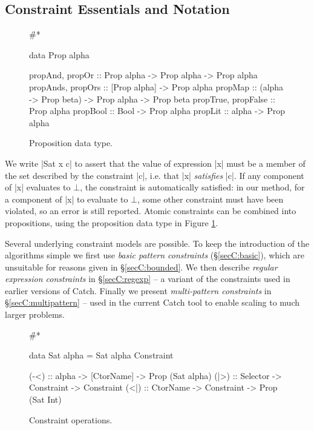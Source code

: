 \subsection{Constraint Essentials and Notation}
\label{secC:constraints}

\begin{figure}
\h{#*}\begin{code}
data Prop alpha

propAnd, propOr           :: Prop alpha -> Prop alpha -> Prop alpha
propAnds, propOrs         :: [Prop alpha] -> Prop alpha
propMap                   :: (alpha -> Prop beta) -> Prop alpha -> Prop beta
propTrue, propFalse       :: Prop alpha
propBool                  :: Bool -> Prop alpha
propLit                   :: alpha -> Prop alpha
\end{code}
\caption{Proposition data type.}
\label{figC:prop}
\end{figure}

We write |Sat x c| to assert that the value of expression |x| must be a member of the set described by the constraint |c|, i.e. that |x| \textit{satisfies} |c|. If any component of |x| evaluates to $\bot{}$, the constraint is automatically satisfied: in our method, for a component of |x| to evaluate to $\bot{}$, some other constraint must have been violated, so an error is still reported. Atomic constraints can be combined into propositions, using the proposition data type in Figure \ref{figC:prop}.

Several underlying constraint models are possible. To keep the introduction of the algorithms simple we first use \textit{basic pattern constraints} (\S\ref{secC:basic}), which are unsuitable for reasons given in \S\ref{secC:bounded}. We then describe \textit{regular expression constraints} in \S\ref{secC:regexp} -- a variant of the constraints used in earlier versions of Catch. Finally we present \textit{multi-pattern constraints} in \S\ref{secC:multipattern} -- used in the current Catch tool to enable scaling to much larger problems.

\begin{figure}
\h{#*}\begin{code}
data Sat alpha = Sat alpha Constraint

(-<)  :: alpha -> [CtorName] -> Prop (Sat alpha)
(|>)  :: Selector -> Constraint -> Constraint
(<|)  :: CtorName -> Constraint -> Prop (Sat Int)
\end{code}
\caption{Constraint operations.}
\label{figC:constraint}
\end{figure}

